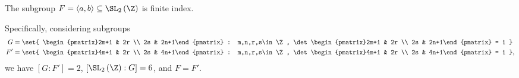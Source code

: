 \documentclass[10pt]{mypackage}
\begin{document}
\begin{proposition}
  The subgroup $F = \left\langle a,b \right\rangle\subseteq \SL_2\left( \Z \right) $ is finite index.

  Specifically, considering subgroups
  \begin{align*}
    G &= \set{ \begin{pmatrix}2m+1 & 2r \\ 2s & 2n+1\end{pmatrix} : m,n,r,s\in \Z, \det \begin{pmatrix}2m+1 & 2r \\ 2s & 2n+1\end{pmatrix} = 1 }\\
    F' &= \set{ \begin{pmatrix}4m+1 & 2r \\ 2s & 4n+1\end{pmatrix} : m,n,r,s\in \Z, \det \begin{pmatrix}4m+1 & 2r \\ 2s & 4n+1\end{pmatrix} = 1 },
  \end{align*}
  we have $\left[ G:F' \right] = 2$, $\left[ \SL_2\left( \Z \right) : G \right] = 6$, and $F = F'$.
\end{proposition}
\end{document}
